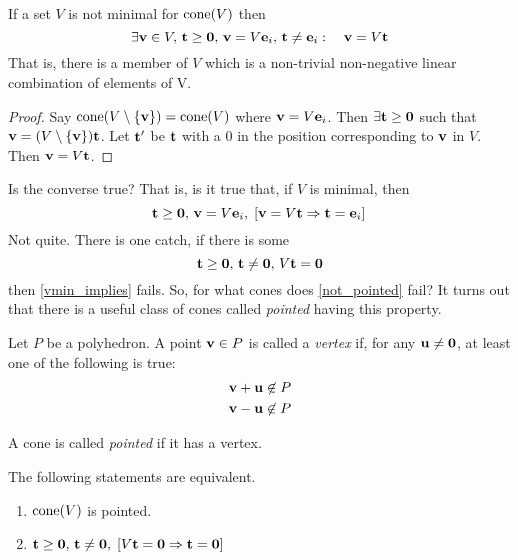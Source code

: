 \begin{Prop}\label{v_not_minimal}
	If a set $V$ is not minimal for $\operatorname{cone}(V)$ then
	\[\exists \mathbf{v}\in V,\, \mathbf{t}\geq\mathbf{0},\, \mathbf{v}=V\mathbf{e}_i,\,\mathbf{t}\neq\mathbf{e}_i:\quad \mathbf{v} = V\mathbf{t} \]
  That is, there is a member of $V$ which is a non-trivial non-negative linear combination of elements of V.
\end{Prop}

\begin{proof}
	Say $\operatorname{cone}(V\setminus\{\mathbf{v}\}) = \operatorname{cone}(V)$ where $\mathbf{v}=V\mathbf{e}_i$.  Then $\exists \mathbf{t}\geq\mathbf{0}$ such that $\mathbf{v}=(V\setminus\{\mathbf{v}\})\mathbf{t}$.  Let $\mathbf{t}'$ be $\mathbf{t}$ with a $0$ in the position corresponding to $\mathbf{v}$ in $V$.  Then $\mathbf{v}=V\mathbf{t}$.
\end{proof}

Is the converse true?  That is, is it true that, if $V$ is minimal, then
\begin{equation} 
  \mathbf{t}\geq\mathbf{0},\,\mathbf{v}=V\mathbf{e}_i,\; [\mathbf{v}=V\mathbf{t} \Rightarrow \mathbf{t}=\mathbf{e}_i]\, \label{vmin_implies}
\end{equation}
Not quite.  There is one catch, if there is some 
\begin{equation}
  \mathbf{t}\geq\mathbf{0},\,\mathbf{t}\neq\mathbf{0},\,V\mathbf{t}=\mathbf{0}  \label{not_pointed}
\end{equation}
then \eqref{vmin_implies} fails.  So, for what cones does \eqref{not_pointed} fail?  It turns out that there is a useful class of cones called \textit{pointed} having this property.

\begin{Def}[Vertex]
	Let $P$ be a polyhedron.  A point $\mathbf{v} \in P$ is called a \textit{vertex} if, for any $\mathbf{u} \neq \mathbf{0}$, at least one of the following is true:
	\begin{align*}
		\mathbf{v} + \mathbf{u} \not\in P \\
		\mathbf{v} - \mathbf{u} \not\in P
	\end{align*}
\end{Def}

\begin{Def}
  A cone is called \textit{pointed} if it has a vertex.
\end{Def}

\begin{Prop} The following statements are equivalent.
  \begin{enumerate}
    \item $\operatorname{cone}(V)$ is pointed.
    \item $\mathbf{t}\geq\mathbf{0},\,\mathbf{t}\neq\mathbf{0},\; [V\mathbf{t}=\mathbf{0} \Rightarrow \mathbf{t}=\mathbf{0}]$
  \end{enumerate}
\end{Prop}

